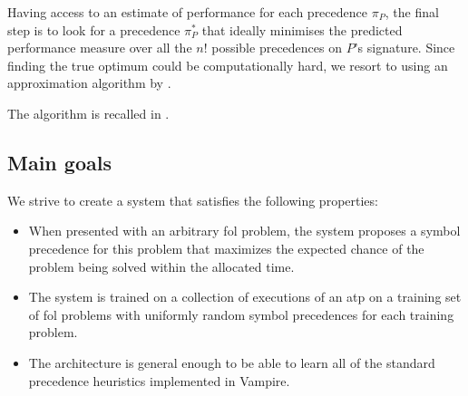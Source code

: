 Having access to an estimate of performance for each precedence $\pi_P$, the final step 
is to look for a precedence $\pi^*_P$ that ideally minimises the predicted performance measure 
over all the $n!$ possible precedences on $P$'s signature. Since finding the true
optimum could be computationally hard, we resort to using an approximation algorithm by \citet{Cohen2011}.

The algorithm is recalled in .



\iffalse

\subsection{Main goals}

We strive to create a system that satisfies the following properties:

\begin{itemize}
	\item When presented with an arbitrary \gls{fol} problem,
	the system proposes a symbol precedence for this problem
	that maximizes the expected chance of the problem being solved
	within the allocated time.
	
	\item The system is trained on a collection of executions of an \gls{atp}
	on a training set of \gls{fol} problems
	with uniformly random symbol precedences for each training problem.
	
	\item The architecture is general enough to be able to learn
	all of the standard precedence heuristics implemented in Vampire.\cite{?}
\end{itemize}


